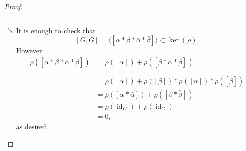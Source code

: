 \documentclass{article}
\newenvironment{problem}[2][Problem]{\begin{trivlist}
\item[\hskip \labelsep {\bfseries #1}\hskip \labelsep {\bfseries #2.}]}{\end{trivlist}}
\begin{document}
\begin{proof}
\begin{enumerate}[(a)]
\[    \]
    \item It is enough to check that \[
      [G, G]
      = \langle [\alpha * \beta * \bar\alpha * \bar\beta] \rangle
      \subset \ker(\rho).
    \] However \begin{align*}
      \rho([\alpha * \beta * \bar\alpha * \bar\beta])
        &= \rho([\alpha]) + \rho([\beta * \bar\alpha * \bar\beta]) \\
        &= \hdots \\
        &= \rho([\alpha]) + \rho([\beta]) * \rho([\bar\alpha]) * \rho([\bar\beta]) \\
        &= \rho([\alpha * \bar\alpha]) + \rho([\beta * \bar\beta]) \\
        &= \rho(\operatorname{id}_G) + \rho(\operatorname{id}_G) \\
        &= 0,
    \end{align*} as desired.
  \end{enumerate}
\end{proof}
\pagebreak
\begin{problem}{2} \text{} \\
\end{problem}
\end{document}
